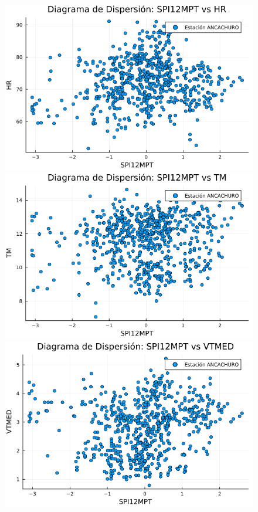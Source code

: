\begin{figure}[htbp]
\begin{minipage}{0.32\textwidth}
    \centering
    \includegraphics[width=\linewidth]{Capitulos/Scaterplot/ANCACHURO_SPI12MPT_vs_HR.png}
\end{minipage}\hfill
\begin{minipage}{0.32\textwidth}
    \centering
    \includegraphics[width=\linewidth]{Capitulos/Scaterplot/ANCACHURO_SPI12MPT_vs_TM.png}
\end{minipage}\hfill
\begin{minipage}{0.32\textwidth}
    \centering
    \includegraphics[width=\linewidth]{Capitulos/Scaterplot/ANCACHURO_SPI12MPT_vs_VTMED.png}

\end{minipage}
\end{figure}
